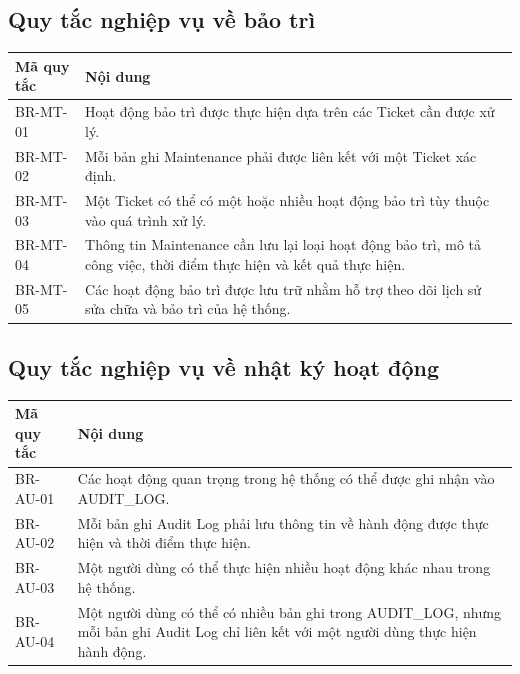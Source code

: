 \subsection{Quy tắc nghiệp vụ về bảo trì}
\begin{center}
\begin{longtable}{|>{\raggedright\arraybackslash}p{3.5cm}|>{\raggedright\arraybackslash}p{11.0cm}|}
\hline
\textbf{Mã quy tắc} & \textbf{Nội dung} \\ \hline
\endhead
BR-MT-01 & Hoạt động bảo trì được thực hiện dựa trên các Ticket cần được xử lý. \\ \hline
BR-MT-02 & Mỗi bản ghi Maintenance phải được liên kết với một Ticket xác định. \\ \hline
BR-MT-03 & Một Ticket có thể có một hoặc nhiều hoạt động bảo trì tùy thuộc vào quá trình xử lý. \\ \hline
BR-MT-04 & Thông tin Maintenance cần lưu lại loại hoạt động bảo trì, mô tả công việc, thời điểm thực hiện và kết quả thực hiện. \\ \hline
BR-MT-05 & Các hoạt động bảo trì được lưu trữ nhằm hỗ trợ theo dõi lịch sử sửa chữa và bảo trì của hệ thống. \\ \hline
\end{longtable}
\end{center}

\subsection{Quy tắc nghiệp vụ về nhật ký hoạt động}
\begin{center}
\begin{longtable}{|>{\raggedright\arraybackslash}p{3.5cm}|>{\raggedright\arraybackslash}p{11.0cm}|}
\hline
\textbf{Mã quy tắc} & \textbf{Nội dung} \\ \hline
\endhead
BR-AU-01 & Các hoạt động quan trọng trong hệ thống có thể được ghi nhận vào AUDIT\_LOG. \\ \hline
BR-AU-02 & Mỗi bản ghi Audit Log phải lưu thông tin về hành động được thực hiện và thời điểm thực hiện. \\ \hline
BR-AU-03 & Một người dùng có thể thực hiện nhiều hoạt động khác nhau trong hệ thống. \\ \hline
BR-AU-04 & Một người dùng có thể có nhiều bản ghi trong AUDIT\_LOG, nhưng mỗi bản ghi Audit Log chỉ liên kết với một người dùng thực hiện hành động. \\ \hline
\end{longtable}
\end{center}

